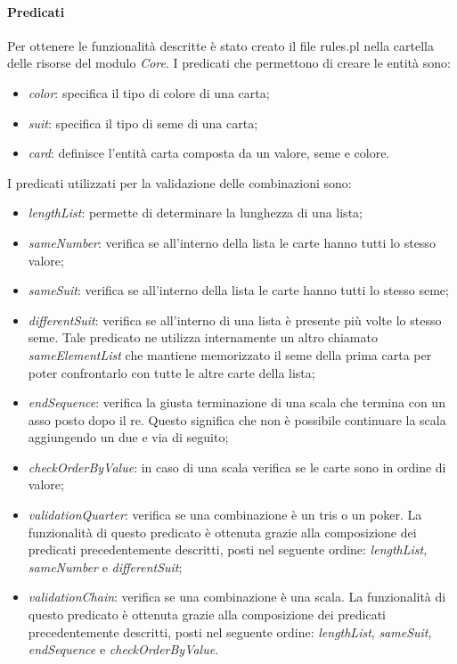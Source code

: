 \paragraph{Predicati}
Per ottenere le funzionalità descritte è stato creato il file rules.pl nella cartella delle risorse del modulo \textit{Core}.
\newline \newline
I predicati che permettono di creare le entità sono:
\begin{itemize}
    \item \textit{color}: specifica il tipo di colore di una carta;
    \item \textit{suit}: specifica il tipo di seme di una carta;
    \item \textit{card}: definisce l’entità carta composta da un valore, seme e colore.
\end{itemize}

I predicati utilizzati per la validazione delle combinazioni sono:
\begin{itemize}
    \item \textit{lengthList}: permette di determinare la lunghezza di una lista;
    \item \textit{sameNumber}: verifica se all’interno della lista le carte hanno tutti lo stesso valore;
    \item \textit{sameSuit}: verifica se all’interno della lista le carte hanno tutti lo stesso seme;
    \item \textit{differentSuit}: verifica se all’interno di una lista è presente più volte lo stesso seme.
    Tale predicato ne utilizza internamente un altro chiamato \textit{sameElementList} che mantiene memorizzato il seme della prima carta per poter confrontarlo con tutte le altre carte della lista;
    \item \textit{endSequence}: verifica la giusta terminazione di una scala che termina con un asso posto dopo il re.
    Questo significa che non è possibile continuare la scala aggiungendo un due e via di seguito;
    \item \textit{checkOrderByValue}: in caso di una scala verifica se le carte sono in ordine di valore;
    \item \textit{validationQuarter}: verifica se una combinazione è un tris o un poker.
    La funzionalità di questo predicato è ottenuta grazie alla composizione dei predicati precedentemente descritti, posti nel seguente ordine: \textit{lengthList}, \textit{sameNumber} e \textit{differentSuit};
    \item \textit{validationChain}: verifica se una combinazione è una scala.
    La funzionalità di questo predicato è ottenuta grazie alla composizione dei predicati precedentemente descritti, posti nel seguente ordine: \textit{lengthList}, \textit{sameSuit}, \textit{endSequence} e \textit{checkOrderByValue}.
\end{itemize}

